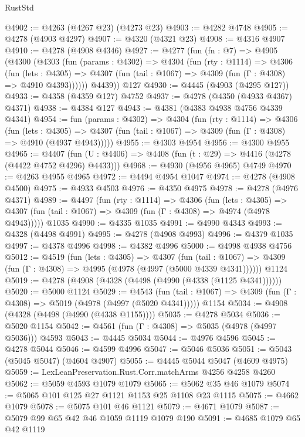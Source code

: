 \begin{lexlean}{RustStd}
\begin{coremodule}
@4902 := @4263 (@4267 @23) (@4273 @23)
@4903 := @4282 @4748
@4905 := @4278 (@4903 @4297)
@4907 := @4320 (@4321 @23)
@4908 := @4316 @4907
@4910 := @4278 (@4908 @4346)
@4927 := @4277
    (fun (fn : @7) =>
    @4905
      (@4300
        (@4303
          (fun (params : @4302) =>
          @4304
            (fun (rty : @1114) =>
            @4306
              (fun (lets : @4305) =>
              @4307 (fun (tail : @1067) => @4309 (fun (Γ : @4308) => @4910 @4393))))))
        @4439))
    @127
@4930 := @4445 (@4903 (@4295 @127))
@4933 := @4358 (@4359 @127) @4752
@4937 := @4278 (@4350 (@4933 @4367) @4371)
@4938 := @4384 @127
@4943 := @4381 (@4383 @4938 @4756 @4339 @4341)
@4954 := fun (params : @4302) =>
  @4304
    (fun (rty : @1114) =>
    @4306
      (fun (lets : @4305) =>
      @4307 (fun (tail : @1067) => @4309 (fun (Γ : @4308) => @4910 (@4937 @4943)))))
@4955 := @4303 @4954
@4956 := @4300 @4955
@4965 := @4407 (fun (U : @4406) => @4408 (fun (t : @29) => @4416 (@4278 (@4422 @4752 @4296) @4433)))
@4968 := @4930 (@4956 @4965) @4749
@4970 := @4263 @4955 @4965
@4972 := @4494 @4954 @1047
@4974 := @4278 (@4908 @4500)
@4975 := @4933 @4503
@4976 := @4350 @4975
@4978 := @4278 (@4976 @4371)
@4989 := @4497
    (fun (rty : @1114) =>
    @4306
      (fun (lets : @4305) =>
      @4307 (fun (tail : @1067) => @4309 (fun (Γ : @4308) => @4974 (@4978 @4943)))))
    @1035
@4990 := @4335 @1035
@4991 := @4990 @4343
@4993 := @4328 (@4498 @4991)
@4995 := @4278 (@4908 @4993)
@4996 := @4379 @1035
@4997 := @4378 @4996
@4998 := @4382 @4996
@5000 := @4998 @4938 @4756
@5012 := @4519
    (fun (lets : @4305) =>
    @4307
      (fun (tail : @1067) => @4309 (fun (Γ : @4308) => @4995 (@4978 (@4997 (@5000 @4339 @4341))))))
    @1124
@5019 := @4278 (@4908 (@4328 (@4498 (@4990 (@4338 (@1125 @4341))))))
@5020 := @5000 @1124
@5029 := @4543
    (fun (tail : @1067) => @4309 (fun (Γ : @4308) => @5019 (@4978 (@4997 (@5020 @4341)))))
    @1154
@5034 := @4908 (@4328 (@4498 (@4990 (@4338 @1155))))
@5035 := @4278 @5034
@5036 := @5020 @1154
@5042 := @4561 (fun (Γ : @4308) => @5035 (@4978 (@4997 @5036))) @4593
@5043 := @4445 @5034
@5044 := @4976 @4596
@5045 := @4278 @5044
@5046 := @4599 @4996
@5047 := @5046 @5036
@5051 := @5043 (@5045 @5047) (@4604 @4907)
@5055 := @4445 @5044 @5047 (@4609 @4975)
@5059 := LexLeanPreservation.Rust.Corr.matchArms @4256 @4258 @4260
@5062 := @5059 @4593 @1079 @1079
@5065 := @5062 @35 @46 @1079
@5074 := @5065 @101 @125 @27 @1121 @1153 @25 @1108 @23 @1115
@5075 := @4662 @1079
@5078 := @5075 @101 @46 @1121
@5079 := @4671 @1079
@5087 := @5079 @99 @65 @42 @46 @1059 @1119 @1079 @190
@5091 := @4685 @1079 @65 @42 @1119

\end{coremodule}
\end{lexlean}
